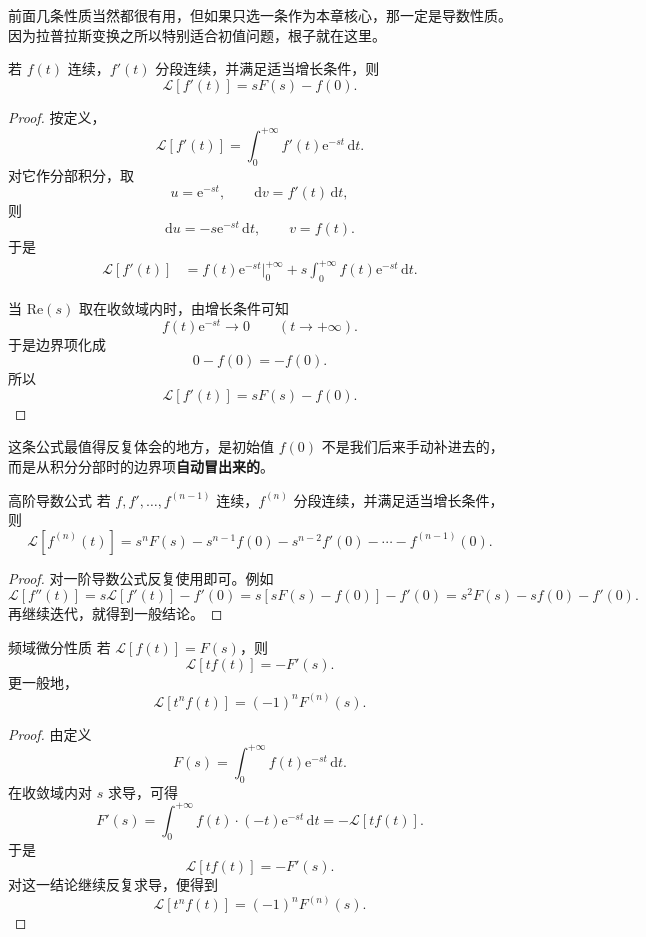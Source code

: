 前面几条性质当然都很有用，但如果只选一条作为本章核心，那一定是导数性质。因为拉普拉斯变换之所以特别适合初值问题，根子就在这里。

\begin{zhongyao}[最重要的一条性质]
若 $f(t)$ 连续，$f'(t)$ 分段连续，并满足适当增长条件，则
\[
    \mathcal{L}[f'(t)]
    =
    sF(s)-f(0).
\]
\end{zhongyao}

\begin{proof}
按定义，
\[
    \mathcal{L}[f'(t)]
    =
    \int_0^{+\infty} f'(t)\mathrm{e}^{-st}\,\mathrm{d}t.
\]
对它作分部积分，取
\[
    u=\mathrm{e}^{-st},\qquad \mathrm{d}v=f'(t)\,\mathrm{d}t,
\]
则
\[
    \mathrm{d}u=-s\mathrm{e}^{-st}\,\mathrm{d}t,\qquad v=f(t).
\]
于是
\begin{align}
    \mathcal{L}[f'(t)]
    &=
    f(t)\mathrm{e}^{-st}\Big|_0^{+\infty}
    +
    s\int_0^{+\infty} f(t)\mathrm{e}^{-st}\,\mathrm{d}t.
\end{align}

当 $\mathrm{Re}(s)$ 取在收敛域内时，由增长条件可知
\[
    f(t)\mathrm{e}^{-st}\to 0
    \qquad (t\to+\infty).
\]
于是边界项化成
\[
    0-f(0)=-f(0).
\]
所以
\[
    \mathcal{L}[f'(t)]
    =
    sF(s)-f(0).
\]
\end{proof}

这条公式最值得反复体会的地方，是初始值 $f(0)$ 不是我们后来手动补进去的，而是从积分分部时的边界项\textbf{自动冒出来的}。

\begin{dingli}{高阶导数公式}{}
若 $f,f',\dots,f^{(n-1)}$ 连续，$f^{(n)}$ 分段连续，并满足适当增长条件，则
\[
    \mathcal{L}[f^{(n)}(t)]
    =
    s^nF(s)
    -
    s^{n-1}f(0)
    -
    s^{n-2}f'(0)
    -
    \cdots
    -
    f^{(n-1)}(0).
\]
\end{dingli}

\begin{proof}
对一阶导数公式反复使用即可。例如
\[
    \mathcal{L}[f''(t)]
    =
    s\mathcal{L}[f'(t)]-f'(0)
    =
    s[sF(s)-f(0)]-f'(0)
    =
    s^2F(s)-sf(0)-f'(0).
\]
再继续迭代，就得到一般结论。
\end{proof}

\begin{dingli}{频域微分性质}{}
若 $\mathcal{L}[f(t)]=F(s)$，则
\[
    \mathcal{L}[t f(t)]
    =
    -F'(s).
\]
更一般地，
\[
    \mathcal{L}[t^n f(t)]
    =
    (-1)^n F^{(n)}(s).
\]
\end{dingli}

\begin{proof}
由定义
\[
    F(s)=\int_0^{+\infty} f(t)\mathrm{e}^{-st}\,\mathrm{d}t.
\]
在收敛域内对 $s$ 求导，可得
\[
    F'(s)
    =
    \int_0^{+\infty} f(t)\cdot (-t)\mathrm{e}^{-st}\,\mathrm{d}t
    =
    -\mathcal{L}[t f(t)].
\]
于是
\[
    \mathcal{L}[t f(t)]
    =
    -F'(s).
\]
对这一结论继续反复求导，便得到
\[
    \mathcal{L}[t^n f(t)]
    =
    (-1)^n F^{(n)}(s).
\]
\end{proof}

